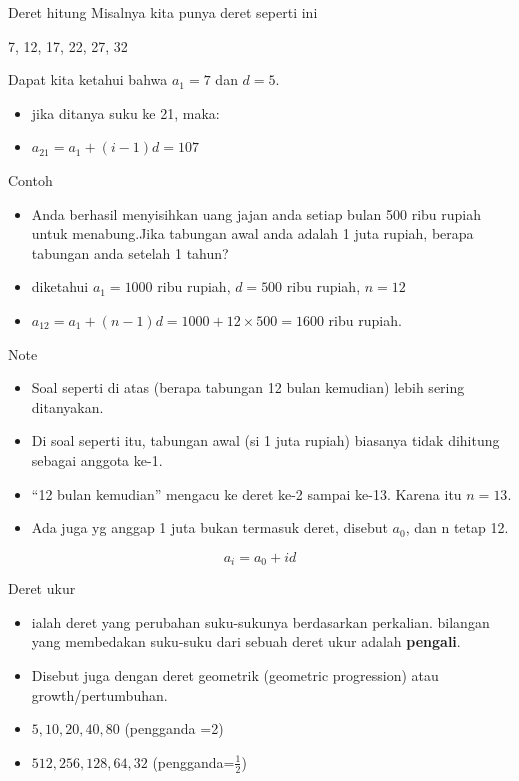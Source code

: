 \documentclass[
  ignorenonframetext,
]{beamer}
\begin{document}
\begin{frame}{Deret hitung}
\label{deret-hitung-2}
Misalnya kita punya deret seperti ini

7, 12, 17, 22, 27, 32

Dapat kita ketahui bahwa \(a_1=7\) dan \(d=5\).

\begin{itemize}[<+->]
\item
  jika ditanya suku ke 21, maka:
\item
  \(a_21=a_1+(i-1)d=107\)
\end{itemize}
\end{frame}

\begin{frame}{Contoh}
\label{contoh-3}
\begin{itemize}[<+->]
\item
  Anda berhasil menyisihkan uang jajan anda setiap bulan 500 ribu rupiah
  untuk menabung.Jika tabungan awal anda adalah 1 juta rupiah, berapa
  tabungan anda setelah 1 tahun?
\item
  diketahui \(a_1=1000\) ribu rupiah, \(d=500\) ribu rupiah, \(n=12\)
\item
  \(a_12=a_1+(n-1)d=1000+12\times 500=1600\) ribu rupiah.
\end{itemize}
\end{frame}

\begin{frame}{Note}
\label{note-1}
\begin{itemize}
\item
  Soal seperti di atas (berapa tabungan 12 bulan kemudian) lebih sering
  ditanyakan.
\item
  Di soal seperti itu, tabungan awal (si 1 juta rupiah) biasanya tidak
  dihitung sebagai anggota ke-1.
\item
  ``12 bulan kemudian'' mengacu ke deret ke-2 sampai ke-13. Karena itu
  \(n=13\).
\item
  Ada juga yg anggap 1 juta bukan termasuk deret, disebut \(a_0\), dan n
  tetap 12.
\end{itemize}

\[
a_i=a_0+id
\]
\end{frame}

\begin{frame}{Deret ukur}
\label{deret-ukur}
\begin{itemize}
\item
  ialah deret yang perubahan suku-sukunya berdasarkan perkalian.
  bilangan yang membedakan suku-suku dari sebuah deret ukur adalah
  \textbf{pengali}.
\item
  Disebut juga dengan deret geometrik (geometric progression) atau
  growth/pertumbuhan.
\item
  \(5,10,20,40,80\) (pengganda =2)
\item
  \(512, 256, 128,64,32\) (pengganda=\(\frac{1}{2}\))
\end{itemize}
\end{frame}
\end{document}
